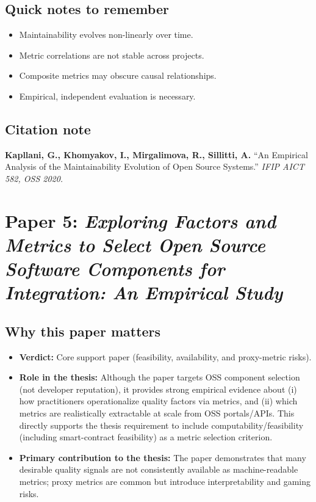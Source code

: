 \documentclass[11pt,a4paper]{article}
\begin{document}
\subsection{Quick notes to remember}
\begin{itemize}[leftmargin=*]
  \item Maintainability evolves non-linearly over time.
  \item Metric correlations are not stable across projects.
  \item Composite metrics may obscure causal relationships.
  \item Empirical, independent evaluation is necessary.
\end{itemize}

\subsection{Citation note}
\noindent\textbf{Kapllani, G., Khomyakov, I., Mirgalimova, R., Sillitti, A.} ``An Empirical Analysis of the Maintainability Evolution of Open Source Systems.'' \textit{IFIP AICT 582, OSS 2020.}

\newpage
\section{Paper 5: \textit{Exploring Factors and Metrics to Select Open Source Software Components for Integration: An Empirical Study}}

\subsection{Why this paper matters}
\begin{itemize}[leftmargin=*]
  \item \textbf{Verdict:} Core support paper (feasibility, availability, and proxy-metric risks).
  \item \textbf{Role in the thesis:} Although the paper targets OSS component selection (not developer reputation), it provides strong empirical evidence about (i) how practitioners operationalize quality factors via metrics, and (ii) which metrics are realistically extractable at scale from OSS portals/APIs. This directly supports the thesis requirement to include computability/feasibility (including smart-contract feasibility) as a metric selection criterion.
  \item \textbf{Primary contribution to the thesis:} The paper demonstrates that many desirable quality signals are not consistently available as machine-readable metrics; proxy metrics are common but introduce interpretability and gaming risks.
\end{itemize}
\end{document}
